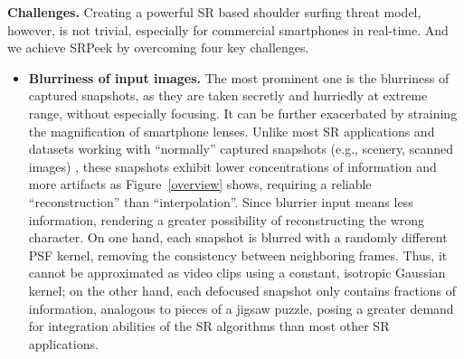 \vspace{1mm}
\noindent
\textbf{Challenges.} Creating a powerful SR based shoulder surfing threat model, however, is not trivial, especially for commercial smartphones in real-time. And we achieve \textsf{SRPeek} by overcoming four key challenges.

\begin{itemize}[leftmargin=*]
  \item \textbf{Blurriness of input images.} The most prominent one is the blurriness of captured snapshots, as they are taken secretly and hurriedly at extreme range, without especially focusing. It can be further exacerbated by straining the magnification of smartphone lenses. Unlike most SR applications and datasets working with ``normally'' captured snapshots (e.g., scenery, scanned images) \cite{nasrollahi2020deep,lyn2020image}, these snapshots exhibit lower concentrations of information and more artifacts as Figure~\ref{overview} shows, requiring a reliable ``reconstruction'' than ``interpolation''. Since blurrier input means less information, rendering a greater possibility of reconstructing the wrong character. 
  On one hand, each snapshot is blurred with a randomly different PSF kernel, removing the consistency between neighboring frames. Thus, it cannot be approximated as video clips using a constant, isotropic Gaussian kernel; on the other hand, each defocused snapshot only contains fractions of information, analogous to pieces of a jigsaw puzzle, posing a greater demand for integration abilities of the SR algorithms than most other SR applications.

\end{itemize}
